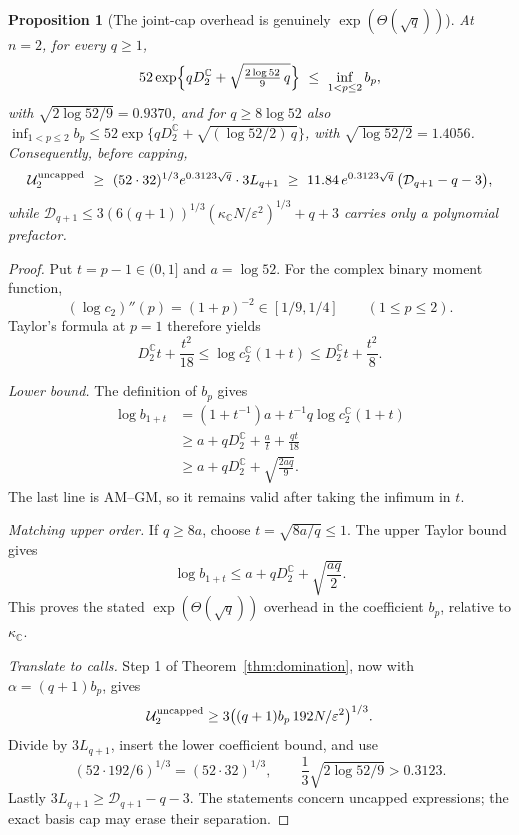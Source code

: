 \documentclass[11pt,a4paper]{article}
\newtheorem{proposition}[theorem]{Proposition}
\theoremstyle{definition}\newtheorem{definition}[theorem]{Definition}
\theoremstyle{remark}\newtheorem{remark}[theorem]{Remark}
\numberwithin{equation}{section}
\newcommand{\C}{\mathbb C}
\newcommand{\eps}{\varepsilon}
\begin{document}
\begin{proposition}[The joint-cap overhead is genuinely $\exp(\Theta(\sqrt q))$]\label{prop:overhead}
At $n=2$, for every $q\ge1$,
\[
 52\exp\Bigl\{qD_2^{\C}+\sqrt{\tfrac{2\log52}{9}\,q}\Bigr\}\ \le\ \inf_{1<p\le2}b_p,
\]
with $\sqrt{2\log52/9}=0.9370$, and for $q\ge8\log52$ also
$\inf_{1<p\le2}b_p\le52\exp\{qD_2^{\C}+\sqrt{(\log52/2)\,q}\}$, with
$\sqrt{\log52/2}=1.4056$. Consequently, before capping,
\[
 \mathcal U_2^{\rm uncapped}\ \ge\ (52\cdot32)^{1/3}e^{0.3123\sqrt q}\cdot3L_{q+1}
 \ \ge\ 11.84\,e^{0.3123\sqrt q}\,\bigl(\mathcal D_{q+1}-q-3\bigr),
\]
while $\mathcal D_{q+1}\le3(6(q+1))^{1/3}(\kappa_{\C}N/\eps^2)^{1/3}+q+3$ carries only a
polynomial prefactor.
\end{proposition}
\begin{proof}
Put \(t=p-1\in(0,1]\) and \(a=\log52\).
For the complex binary moment function,
\[
 (\log c_2)''(p)=(1+p)^{-2}\in[1/9,1/4]
 \qquad(1\le p\le2).
\]
Taylor's formula at \(p=1\) therefore yields
\[
 D_2^{\C}t+\frac{t^2}{18}
 \le\log c_2^{\C}(1+t)
 \le D_2^{\C}t+\frac{t^2}{8}.
\]

\emph{Lower bound.}
The definition of \(b_p\) gives
\begin{align*}
 \log b_{1+t}
 &=(1+t^{-1})a+t^{-1}q\log c_2^{\C}(1+t)\\
 &\ge a+qD_2^{\C}+\frac at+\frac{qt}{18}\\
 &\ge a+qD_2^{\C}+\sqrt{\frac{2aq}{9}}.
\end{align*}
The last line is AM--GM, so it remains valid after taking the infimum in \(t\).

\emph{Matching upper order.}
If \(q\ge8a\), choose \(t=\sqrt{8a/q}\le1\).
The upper Taylor bound gives
\[
 \log b_{1+t}\le a+qD_2^{\C}+\sqrt{\frac{aq}{2}}.
\]
This proves the stated \(\exp(\Theta(\sqrt q))\) overhead in the
coefficient \(b_p\), relative to \(\kappa_{\C}\).

\emph{Translate to calls.}
Step 1 of Theorem~\ref{thm:domination}, now with
\(\alpha=(q+1)b_p\), gives
\[
 \mathcal U_2^{\rm uncapped}
 \ge3\bigl((q+1)b_p\,192N/\eps^2\bigr)^{1/3}.
\]
Divide by \(3L_{q+1}\), insert the lower coefficient bound, and use
\[
 (52\cdot192/6)^{1/3}=(52\cdot32)^{1/3},
 \qquad \frac13\sqrt{2\log52/9}>0.3123.
\]
Lastly \(3L_{q+1}\ge\mathcal D_{q+1}-q-3\).
The statements concern uncapped expressions; the exact basis cap
may erase their separation.
\end{proof}
\end{document}
